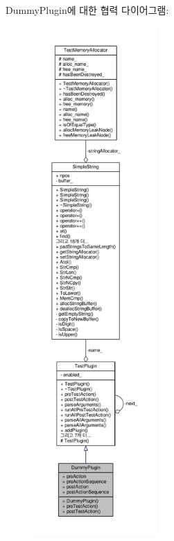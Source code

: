 Dummy\+Plugin에 대한 협력 다이어그램\+:
\nopagebreak
\begin{figure}[H]
\begin{center}
\leavevmode
\includegraphics[height=550pt]{class_dummy_plugin__coll__graph}
\end{center}
\end{figure}
